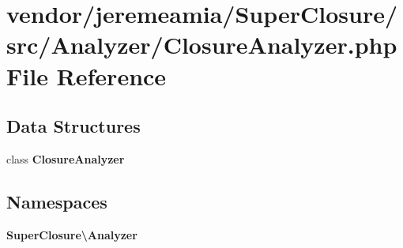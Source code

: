 \section{vendor/jeremeamia/\+Super\+Closure/src/\+Analyzer/\+Closure\+Analyzer.php File Reference}
\label{_closure_analyzer_8php}
\subsection*{Data Structures}
\begin{DoxyCompactItemize}
\item 
class {\bf Closure\+Analyzer}
\end{DoxyCompactItemize}
\subsection*{Namespaces}
\begin{DoxyCompactItemize}
\item 
 {\bf Super\+Closure\textbackslash{}\+Analyzer}
\end{DoxyCompactItemize}
